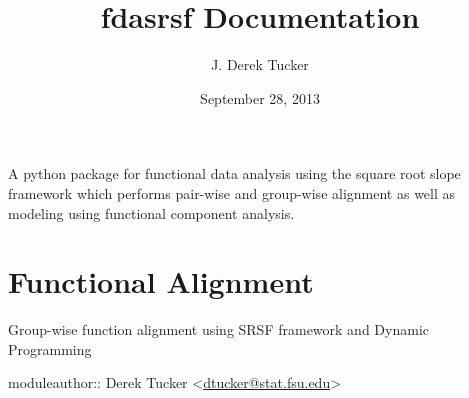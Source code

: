 \documentclass[letterpaper,10pt,english]{sphinxmanual}
\title{fdasrsf Documentation}
\date{September 28, 2013}
\author{J. Derek Tucker}
\begin{document}
\maketitle
\tableofcontents
{}\label{index::doc}


A python package for functional data analysis using the square root slope framework which performs pair-wise and
group-wise alignment as well as modeling using functional component analysis.


\chapter{Functional Alignment}
\label{time_warping:module-time_warping}\label{time_warping:functional-alignment}\label{time_warping::doc}\label{time_warping:welcome-to-fdasrsf-s-documentation}
Group-wise function alignment using SRSF framework and Dynamic Programming

moduleauthor:: Derek Tucker \textless{}\href{mailto:dtucker@stat.fsu.edu}{dtucker@stat.fsu.edu}\textgreater{}
\end{document}
